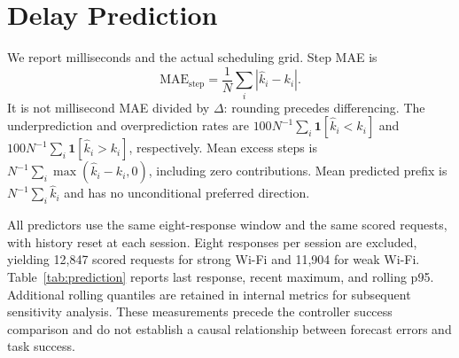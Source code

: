 \documentclass[11pt]{article}
\begin{document}
\section{Delay Prediction}
We report milliseconds and the actual scheduling grid. Step MAE is
\[
 \mathrm{MAE}_{\mathrm{step}}=\frac{1}{N}\sum_i |\hat k_i-k_i|.
\]
It is not millisecond MAE divided by $\Delta$: rounding precedes differencing. The underprediction and overprediction rates are $100N^{-1}\sum_i\mathbf{1}[\hat k_i<k_i]$ and $100N^{-1}\sum_i\mathbf{1}[\hat k_i>k_i]$, respectively. Mean excess steps is $N^{-1}\sum_i\max(\hat k_i-k_i,0)$, including zero contributions. Mean predicted prefix is $N^{-1}\sum_i\hat k_i$ and has no unconditional preferred direction.

All predictors use the same eight-response window and the same scored requests, with history reset at each session. Eight responses per session are excluded, yielding 12,847 scored requests for strong Wi-Fi and 11,904 for weak Wi-Fi. Table~\ref{tab:prediction} reports last response, recent maximum, and rolling p95. Additional rolling quantiles are retained in internal metrics for subsequent sensitivity analysis. These measurements precede the controller success comparison and do not establish a causal relationship between forecast errors and task success.
\end{document}
